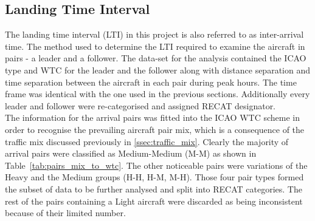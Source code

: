 \subsection{Landing Time Interval}\label{ssec:LTI}
The landing time interval (LTI) in this project is also referred to as inter-arrival time. The method used to determine the LTI required to examine the aircraft in pairs - a leader and a follower. The data-set for the analysis contained the ICAO type and WTC for the leader and the follower along with distance separation and time separation between the aircraft in each pair during peak hours. The time frame was identical with the one used in the previous sections. Additionally every leader and follower were re-categorised and assigned RECAT designator.\\
The information for the arrival pairs was fitted into the ICAO WTC scheme in order to recognise the prevailing aircraft pair mix, which is a consequence of the traffic mix discussed previously in \ref{ssec:traffic_mix}. Clearly the majority of arrival pairs were classified as Medium-Medium (M-M) as shown in Table~\ref{tab:pairs_mix_to_wtc}. The other noticeable pairs were variations of the Heavy and the Medium groups (H-H, H-M, M-H). Those four pair types formed the subset of data to be further analysed and split into RECAT categories. The rest of the pairs containing a Light aircraft were discarded as being inconsistent because of their limited number. 
\begin{table}[h]
\centering
{}
\caption[BIKF traffic mix sorted into ICAO WTC]{Number of ICAO pairs from the traffic mix at BIKF arranged into the corresponding wake categories.}
\label{tab:pairs_mix_to_wtc}
\end{table}

